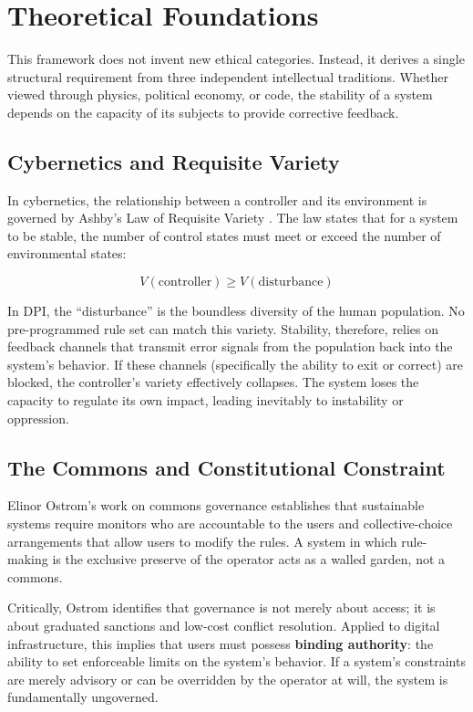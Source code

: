 \documentclass{article}
\begin{document}
\section{Theoretical Foundations}

This framework does not invent new ethical categories. Instead, it derives a single structural requirement from three independent intellectual traditions. Whether viewed through physics, political economy, or code, the stability of a system depends on the capacity of its subjects to provide corrective feedback.

\subsection{Cybernetics and Requisite Variety}

In cybernetics, the relationship between a controller and its environment is governed by Ashby's Law of Requisite Variety \citep{ashby1956}. The law states that for a system to be stable, the number of control states must meet or exceed the number of environmental states:

\begin{equation}
V(\text{controller}) \geq V(\text{disturbance})
\end{equation}

In DPI, the ``disturbance'' is the boundless diversity of the human population. No pre-programmed rule set can match this variety. Stability, therefore, relies on feedback channels that transmit error signals from the population back into the system's behavior. If these channels (specifically the ability to exit or correct) are blocked, the controller's variety effectively collapses. The system loses the capacity to regulate its own impact, leading inevitably to instability or oppression.

\subsection{The Commons and Constitutional Constraint}

Elinor Ostrom's work on commons governance \citep{ostrom1990} establishes that sustainable systems require monitors who are accountable to the users and collective-choice arrangements that allow users to modify the rules. A system in which rule-making is the exclusive preserve of the operator acts as a walled garden, not a commons.

Critically, Ostrom identifies that governance is not merely about access; it is about graduated sanctions and low-cost conflict resolution. Applied to digital infrastructure, this implies that users must possess \textbf{binding authority}: the ability to set enforceable limits on the system's behavior. If a system's constraints are merely advisory or can be overridden by the operator at will, the system is fundamentally ungoverned.
\end{document}
